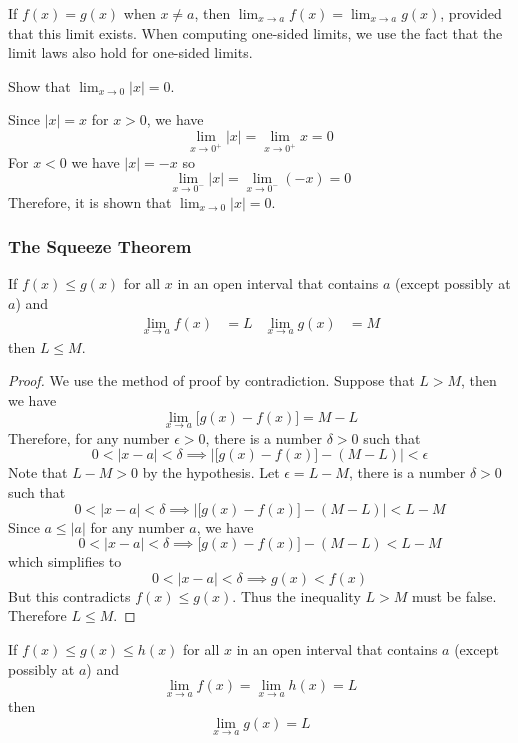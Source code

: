 If \(f(x)=g(x)\) when \(x\neq a\),
then \(\displaystyle{\lim_{x\to a}f(x)=\lim_{x\to a}g(x)}\),
provided that this limit exists.
When computing one-sided limits,
we use the fact that the limit laws also hold for one-sided limits.
\begin{problem}
    Show that \(\displaystyle{\lim_{x\to 0}|x|=0}\).
\end{problem}
\begin{solution}
    Since \(|x|=x\) for \(x>0\),
    we have
    \[\lim_{x\to 0^+}|x|=\lim_{x\to 0^+}x=0\]
    For \(x<0\) we have \(|x|=-x\) so
    \[\lim_{x\to 0^-}|x|=\lim_{x\to 0^-}(-x)=0\]
    Therefore,
    it is shown that \(\displaystyle{\lim_{x\to 0}|x|=0}\).
\end{solution}

\subsubsection*{The Squeeze Theorem}
\begin{theorem}
    If \(f(x)\leq g(x)\) for all \(x\) in an open interval that contains
    \(a\) (except possibly at \(a\)) and
    \begin{align*}
        \lim_{x\to a}f(x) &= L & \lim_{x\to a}g(x) &= M
    \end{align*}
    then \(L\leq M\).
\end{theorem}
\begin{proof}
    We use the method of proof by contradiction.
    Suppose  that \(L>M\),
    then we have
    \[\lim_{x\to a}\big[g(x)-f(x)\big]=M-L\]
    Therefore,
    for any number \(\epsilon>0\),
    there is a number \(\delta>0\) such that
    \[0<|x-a|<\delta\implies
    \left|\big[g(x)-f(x)\big]-(M-L)\right|<\epsilon\]
    Note that \(L-M>0\) by the hypothesis.
    Let \(\epsilon=L-M\),
    there is a number \(\delta>0\) such that
    \[0<|x-a|<\delta\implies\left|\big[g(x)-f(x)\big]-(M-L)\right|<L-M\]
    Since \(a\leq|a|\) for any number \(a\),
    we have
    \[0<|x-a|<\delta\implies \big[g(x)-f(x)\big]-(M-L)<L-M\]
    which simplifies to
    \[0<|x-a|<\delta\implies g(x)<f(x)\]
    But this contradicts \(f(x)\leq g(x)\).
    Thus the inequality \(L>M\) must be false.
    Therefore \(L\leq M\).
\end{proof}
\begin{theorem}
    If \(f(x)\leq g(x)\leq h(x)\) for all \(x\) in an open interval that
    contains \(a\) (except possibly at \(a\)) and
    \[\lim_{x\to a}f(x)=\lim_{x\to a}h(x)=L\]
    then
    \[\lim_{x\to a}g(x)=L\]
\end{theorem}

